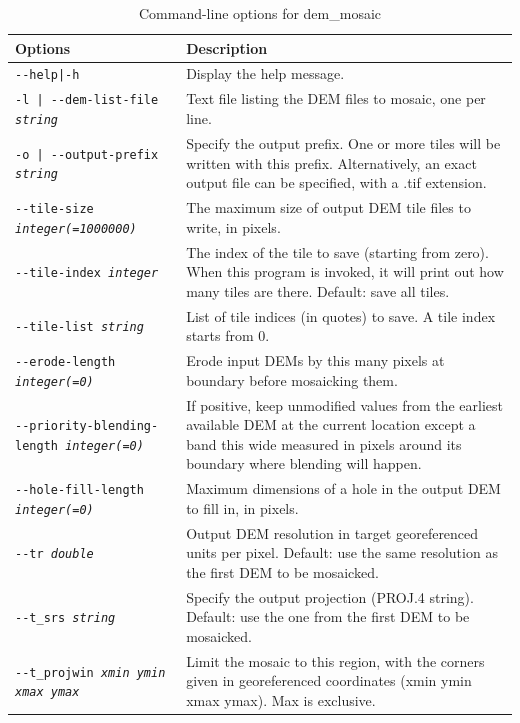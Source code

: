 \begin{longtable}{|l|p{10cm}|}
\caption{Command-line options for dem\_mosaic}
\label{tbl:demmosaic}
\endfirsthead
\endhead
\endfoot
\endlastfoot
\hline
Options & Description \\
\hline \hline

\texttt{-\/-help|-h} & Display the help message.\\ \hline
\texttt{-l | -\/-dem-list-file \textit{string}}  &
Text file listing the DEM files to mosaic, one per line.
\\ \hline
\texttt{-o | -\/-output-prefix  \textit{string} } &
Specify the output prefix. One or more tiles will be written with this prefix. Alternatively, an exact output file can be specified, with a .tif extension.
\\ \hline
\texttt{-\/-tile-size \textit{integer(=1000000)}} &
The maximum size of output DEM tile files to write, in pixels.
\\ \hline
\texttt{-\/-tile-index \textit{integer}} &
The index of the tile to save (starting from zero). When this program is invoked, it will print  out how many tiles are there. Default: save all tiles.
\\ \hline

\texttt{-\/-tile-list \textit{string}} &
List of tile indices (in quotes) to save. A tile index starts from 0.
\\ \hline

\texttt{-\/-erode-length \textit{integer(=0)} }  &
Erode input DEMs by this many pixels at boundary before mosaicking them.
\\ \hline

\texttt{-\/-priority-blending-length \textit{integer(=0)} }  &
If positive, keep unmodified values from the earliest available DEM at the current location except a band this wide measured in pixels around its boundary where blending will happen.
\\ \hline

\texttt{-\/-hole-fill-length \textit{integer(=0)} }  &
Maximum dimensions of a hole in the output DEM to fill in, in pixels.
\\ \hline

\texttt{-\/-tr \textit{double}  } &
Output DEM resolution in target georeferenced units per pixel. Default: use the same resolution as the first DEM to be mosaicked.
\\ \hline
\texttt{-\/-t\_srs \textit{string} } &
Specify the output projection (PROJ.4 string). Default: use the one from the first DEM to be mosaicked.
\\ \hline
\texttt{-\/-t\_projwin \textit{xmin ymin xmax ymax} } &
Limit the mosaic to this region, with the corners given in georeferenced coordinates (xmin ymin xmax ymax). Max is exclusive.
\\ \hline


\end{longtable}
